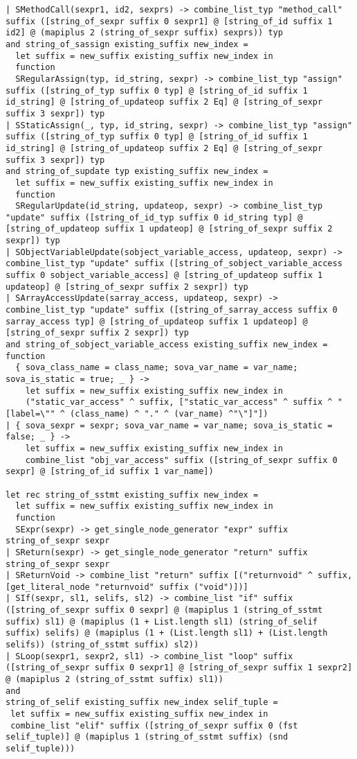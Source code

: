 \documentclass{article}
\begin{document}
\begin{verbatim}
| SMethodCall(sexpr1, id2, sexprs) -> combine_list_typ "method_call" suffix ([string_of_sexpr suffix 0 sexpr1] @ [string_of_id suffix 1 id2] @ (mapiplus 2 (string_of_sexpr suffix) sexprs)) typ
and string_of_sassign existing_suffix new_index =
  let suffix = new_suffix existing_suffix new_index in
  function
  SRegularAssign(typ, id_string, sexpr) -> combine_list_typ "assign" suffix ([string_of_typ suffix 0 typ] @ [string_of_id suffix 1 id_string] @ [string_of_updateop suffix 2 Eq] @ [string_of_sexpr suffix 3 sexpr]) typ
| SStaticAssign(_, typ, id_string, sexpr) -> combine_list_typ "assign" suffix ([string_of_typ suffix 0 typ] @ [string_of_id suffix 1 id_string] @ [string_of_updateop suffix 2 Eq] @ [string_of_sexpr suffix 3 sexpr]) typ
and string_of_supdate typ existing_suffix new_index =
  let suffix = new_suffix existing_suffix new_index in
  function
  SRegularUpdate(id_string, updateop, sexpr) -> combine_list_typ "update" suffix ([string_of_id_typ suffix 0 id_string typ] @ [string_of_updateop suffix 1 updateop] @ [string_of_sexpr suffix 2 sexpr]) typ
| SObjectVariableUpdate(sobject_variable_access, updateop, sexpr) -> combine_list_typ "update" suffix ([string_of_sobject_variable_access suffix 0 sobject_variable_access] @ [string_of_updateop suffix 1 updateop] @ [string_of_sexpr suffix 2 sexpr]) typ
| SArrayAccessUpdate(sarray_access, updateop, sexpr) -> combine_list_typ "update" suffix ([string_of_sarray_access suffix 0 sarray_access typ] @ [string_of_updateop suffix 1 updateop] @ [string_of_sexpr suffix 2 sexpr]) typ
and string_of_sobject_variable_access existing_suffix new_index = function
  { sova_class_name = class_name; sova_var_name = var_name; sova_is_static = true; _ } ->
    let suffix = new_suffix existing_suffix new_index in
    ("static_var_access" ^ suffix, ["static_var_access" ^ suffix ^ " [label=\"" ^ (class_name) ^ "." ^ (var_name) ^"\"]"])
| { sova_sexpr = sexpr; sova_var_name = var_name; sova_is_static = false; _ } ->
    let suffix = new_suffix existing_suffix new_index in
    combine_list "obj_var_access" suffix ([string_of_sexpr suffix 0 sexpr] @ [string_of_id suffix 1 var_name])

let rec string_of_sstmt existing_suffix new_index =
  let suffix = new_suffix existing_suffix new_index in
  function
  SExpr(sexpr) -> get_single_node_generator "expr" suffix string_of_sexpr sexpr
| SReturn(sexpr) -> get_single_node_generator "return" suffix string_of_sexpr sexpr
| SReturnVoid -> combine_list "return" suffix [("returnvoid" ^ suffix, [get_literal_node "returnvoid" suffix ("void")])]
| SIf(sexpr, sl1, selifs, sl2) -> combine_list "if" suffix ([string_of_sexpr suffix 0 sexpr] @ (mapiplus 1 (string_of_sstmt suffix) sl1) @ (mapiplus (1 + List.length sl1) (string_of_selif suffix) selifs) @ (mapiplus (1 + (List.length sl1) + (List.length selifs)) (string_of_sstmt suffix) sl2))
| SLoop(sexpr1, sexpr2, sl1) -> combine_list "loop" suffix ([string_of_sexpr suffix 0 sexpr1] @ [string_of_sexpr suffix 1 sexpr2] @ (mapiplus 2 (string_of_sstmt suffix) sl1))
and
string_of_selif existing_suffix new_index selif_tuple =
 let suffix = new_suffix existing_suffix new_index in
 combine_list "elif" suffix ([string_of_sexpr suffix 0 (fst selif_tuple)] @ (mapiplus 1 (string_of_sstmt suffix) (snd selif_tuple)))


\end{verbatim}
\end{document}
